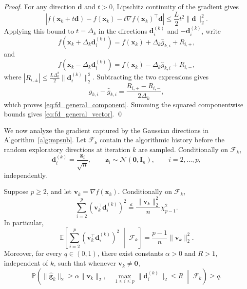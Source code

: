 \documentclass[smallextended]{svjour3}
\newcommand{\bx}{\bm{x}}
\newcommand{\bd}{\bm{d}}
\newcommand{\bg}{\bm{g}}
\newcommand{\bz}{\bm{z}}
\begin{document}
\begin{proof}
For any direction $\bd$ and $t>0$, Lipschitz continuity of the gradient gives
\[
\left| f(\bx_k+t\bd) - f(\bx_k) - t\nabla f(\bx_k)^\top\bd \right| \le \frac{L}{2}t^2\|\bd\|_2^2.
\]
Applying this bound to $t=\Delta_k$ in the directions $\bd_i^{(k)}$ and $-\bd_i^{(k)}$, write
\[
f(\bx_k+\Delta_k\bd_i^{(k)}) = f(\bx_k) + \Delta_k\hat g_{k,i} + R_{i,+},
\]
and
\[
f(\bx_k-\Delta_k\bd_i^{(k)}) = f(\bx_k) - \Delta_k\hat g_{k,i} + R_{i,-},
\]
where $|R_{i,\pm}| \le \frac{L\Delta_k^2}{2} \|\bd_i^{(k)}\|_2^2$.
Subtracting the two expressions gives
\[
g_{k,i}-\hat g_{k,i} = \frac{R_{i,+}-R_{i,-}}{2\Delta_k},
\]
which proves \eqref{eq:fd_general_component}. Summing the squared componentwise bounds gives \eqref{eq:fd_general_vector}.
\qed
\end{proof}
We now analyze the gradient captured by the Gaussian directions in Algorithm~\ref{alg:mpsub}. Let $\mathcal F_k$ contain the algorithmic history before the random exploratory directions at iteration $k$ are sampled. Conditionally on $\mathcal F_k$,
\[
\bd_i^{(k)} = \frac{\bz_i}{\sqrt n}, \qquad \bz_i\sim\mathcal N(\bm0,\bm I_n), \qquad i=2,\ldots,p,
\]
independently.

\begin{lemma}
\label{lem:gaussian_capture}
\label{lem:capture}
Suppose $p\ge 2$, and let $\bm v_k = \nabla f(\bx_k)$. Conditionally on $\mathcal F_k$,
\begin{equation}
\label{eq:chi_square_capture}
\sum_{i=2}^p \left( \bm v_k^\top\bd_i^{(k)} \right)^2 \overset{d}{=} \frac{\|\bm v_k\|_2^2}{n} \chi^2_{p-1}.
\end{equation}
In particular,
\begin{equation}
\label{eq:expected_gaussian_capture}
\mathbb E \left[ \sum_{i=2}^p \left( \bm v_k^\top\bd_i^{(k)} \right)^2 \;\middle|\; \mathcal F_k \right] = \frac{p-1}{n} \|\bm v_k\|_2^2.
\end{equation}
Moreover, for every $q\in(0,1)$, there exist constants $\alpha>0$ and $R>1$, independent of $k$, such that whenever $\bm v_k\ne\bm 0$,
\begin{equation}
\label{eq:good_frame_probability}
\mathbb P \left( \|\hat{\bg}_k\|_2 \ge \alpha\|\bm v_k\|_2, \quad \max_{1\le i\le p} \|\bd_i^{(k)}\|_2 \le R \;\middle|\; \mathcal F_k \right) \ge q.
\end{equation}
\end{lemma}
\end{document}
